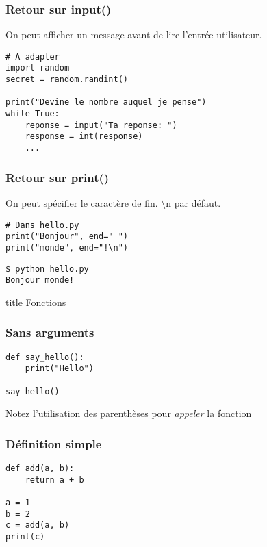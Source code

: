 \documentclass{beamer}
\begin{document}
\begin{frame}[fragile]
  \frametitle{Retour sur input()}
On peut afficher un message avant de lire l'entrée utilisateur.

\begin{lstlisting}
# A adapter
import random
secret = random.randint()

print("Devine le nombre auquel je pense")
while True:
    reponse = input("Ta reponse: ")
    response = int(response)
    ...
\end{lstlisting}


\end{frame}

\begin{frame}[fragile]
  \frametitle{Retour sur print()}

On peut spécifier le caractère de fin. \textbackslash n par défaut.

\begin{lstlisting}
# Dans hello.py
print("Bonjour", end=" ")
print("monde", end="!\n")
\end{lstlisting}

\begin{lstlisting}
$ python hello.py
Bonjour monde!
\end{lstlisting}

\end{frame}


\begin{frame}[fragile]
  \begin{beamercolorbox}[sep=8pt,center,shadow=true,rounded=true]{title}
    Fonctions
  \end{beamercolorbox}
\end{frame}


\begin{frame}[fragile]
  \frametitle{Sans arguments}

\begin{lstlisting}
def say_hello():
    print("Hello")

say_hello()
\end{lstlisting}

\vfill

Notez l'utilisation des parenthèses pour \emph{appeler} la fonction

\end{frame}


\begin{frame}[fragile]
  \frametitle{Définition simple}

\begin{lstlisting}
def add(a, b):
    return a + b

a = 1
b = 2
c = add(a, b)
print(c)
\end{lstlisting}

\end{frame}
\end{document}
